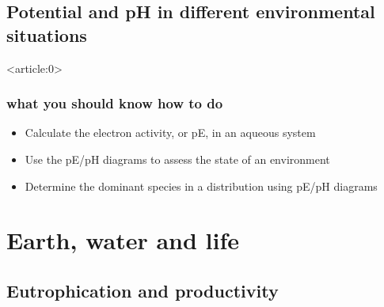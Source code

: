 \documentclass[a4paper,titlepage]{article}
\begin{document}
\subsection{Potential and pH in different environmental
situations}

\begin{frame}<article:0>
\frametitle{what you should know how to do}
\begin{itemize}
\item Calculate the electron activity, or pE, in an aqueous system
\item Use the pE/pH diagrams to assess the state of an environment
\item Determine the dominant species in a distribution using pE/pH diagrams
\end{itemize}
\end{frame}

\section{Earth, water and life}
\subsection{Eutrophication and productivity}
\end{document}

